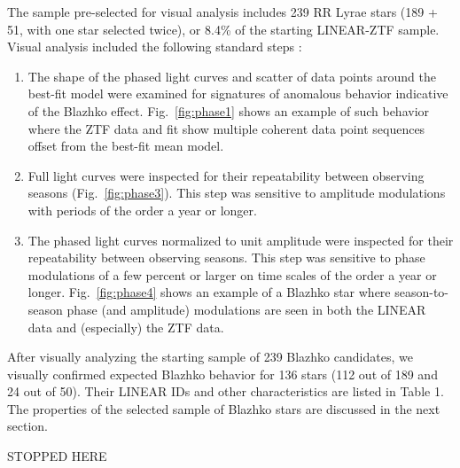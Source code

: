 The sample pre-selected for visual analysis includes 239 RR Lyrae stars (189 + 51, with one star selected twice),
or 8.4\% of the starting LINEAR-ZTF sample. Visual analysis included the following standard steps \citep[e.g.,][]{2009MNRAS.400.1006J}: 
\begin{enumerate}
\item The shape of the phased light curves and scatter of data points around the best-fit model were examined
    for signatures of anomalous behavior indicative of the Blazhko effect. 
    Fig.~\ref{fig:phase1} shows an example of such behavior where the ZTF data and fit show multiple coherent data point sequences
    offset from the best-fit mean model. 
  \item Full light curves were inspected for their repeatability between observing seasons (Fig.~\ref{fig:phase3}).
       This step was sensitive to amplitude modulations with periods of the order a year or longer.  
     \item The phased light curves normalized to unit amplitude were inspected for their repeatability between observing seasons.
       This step was sensitive to phase modulations of a few percent or larger on time scales of the order a year or longer.  
       Fig.~\ref{fig:phase4} shows an example of a Blazhko star where season-to-season phase (and amplitude) modulations
       are seen in both the LINEAR data and (especially) the ZTF data. 
\end{enumerate}

After visually analyzing the starting sample of 239 Blazhko candidates, we visually confirmed expected Blazhko
behavior for 136 stars (112 out of 189 and 24 out of 50).  Their LINEAR IDs and other characteristics are listed in Table 1. 
The properties of the selected sample of Blazhko stars are discussed in the next section. 


STOPPED HERE